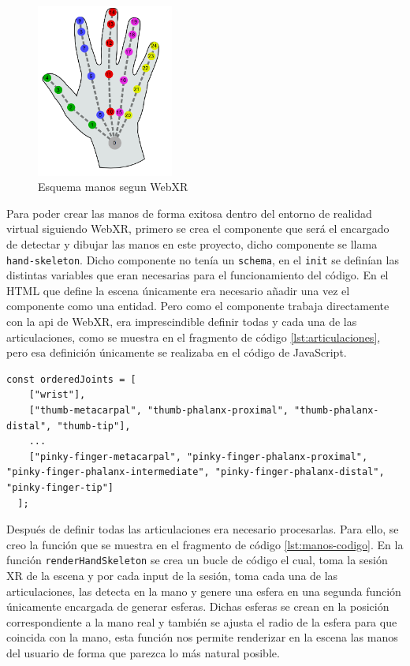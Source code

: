 \documentclass[a4paper, 12pt]{book}
\begin{document}
\begin{figure}[H] 
  \centering
  \includegraphics[width=0.4\textwidth]{img/webxr-mano.png} 
  \caption{Esquema manos segun WebXR}
  \label{fig:WebXR-manos}
\end{figure}

Para poder crear las manos de forma exitosa dentro del entorno de realidad virtual siguiendo WebXR, primero se crea el componente que será el encargado de detectar y dibujar las manos en este proyecto, dicho componente se llama \texttt{hand-skeleton}. Dicho componente no tenía un \texttt{schema}, en el \texttt{init} se definían las distintas variables que eran necesarias para el funcionamiento del código. 
En el HTML que define la escena únicamente era necesario añadir una vez el componente como una entidad. Pero como el componente trabaja directamente con la api de WebXR, era imprescindible definir todas y cada una de las articulaciones, como se muestra en el fragmento de código \ref{lst:articulaciones}, pero esa definición únicamente se realizaba en el código de JavaScript.
\begin{lstlisting}[caption=Definición de articulaciones, captionpos=b, label=lst:articulaciones]
  const orderedJoints = [
    ["wrist"],
    ["thumb-metacarpal", "thumb-phalanx-proximal", "thumb-phalanx-distal", "thumb-tip"],
    ...
    ["pinky-finger-metacarpal", "pinky-finger-phalanx-proximal", "pinky-finger-phalanx-intermediate", "pinky-finger-phalanx-distal", "pinky-finger-tip"]
  ];
\end{lstlisting}
Después de definir todas las articulaciones era necesario procesarlas. 
Para ello, se creo la función que se muestra en el fragmento de código \ref{lst:manos-codigo}. En la función \texttt{renderHandSkeleton} se crea un bucle de código el cual, toma la sesión XR de la escena y por cada input de la sesión, toma cada una de las articulaciones, las detecta en la mano y genere una esfera en una segunda función únicamente encargada de generar esferas. Dichas esferas se crean en la posición correspondiente a la mano real
y también se ajusta el radio de la esfera para que coincida con la mano, esta función nos permite renderizar en la escena las manos del usuario de forma que parezca lo más natural posible. 
\end{document}
